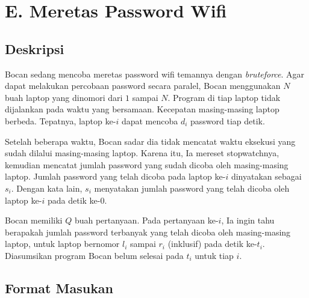 \documentclass{article}
\begin{document}
\pagestyle{fancy}
\fancyhf{}
\renewcommand{\headrulewidth}{0pt}

\section*{\hfil E. Meretas Password Wifi\hfil}


\subsection*{Deskripsi}

\par\noindent Bocan sedang mencoba meretas password wifi temannya dengan \textit{bruteforce}. Agar dapat melakukan percobaan password secara paralel, Bocan menggunakan $N$ buah laptop yang dinomori dari $1$ sampai $N$. Program di tiap laptop tidak dijalankan pada waktu yang bersamaan. Kecepatan masing-masing laptop berbeda. Tepatnya, laptop ke-$i$ dapat mencoba $d_i$ password tiap detik.

\par\noindent Setelah beberapa waktu, Bocan sadar dia tidak mencatat waktu eksekusi yang sudah dilalui masing-masing laptop. Karena itu, Ia mereset stopwatchnya, kemudian mencatat jumlah password yang sudah dicoba oleh masing-masing laptop. Jumlah password yang telah dicoba pada laptop ke-$i$ dinyatakan sebagai $s_i$. Dengan kata lain, $s_i$ menyatakan jumlah password yang telah dicoba oleh laptop ke-$i$ pada detik ke-$0$. 

\par\noindent Bocan memiliki $Q$ buah pertanyaan. Pada pertanyaan ke-$i$, Ia ingin tahu berapakah jumlah password terbanyak yang telah dicoba oleh masing-masing laptop, untuk laptop bernomor $l_i$ sampai $r_i$ (inklusif) pada detik ke-$t_i$. Diasumsikan program Bocan belum selesai pada $t_i$ untuk tiap $i$.

\subsection*{Format Masukan}
\end{document}
